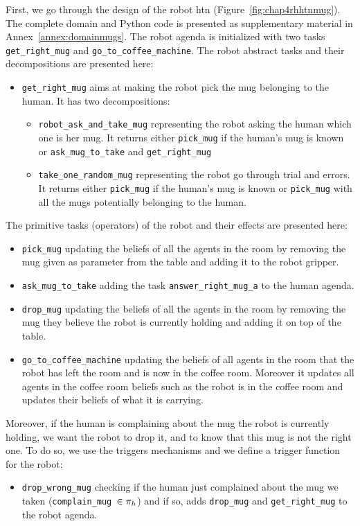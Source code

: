 \documentclass[a4paper,11pt,twoside]{StyleThese}
\begin{document}
First, we go through the design of the robot \acrshort{htn} (Figure~\ref{fig:chap4rhhtnmug}). The complete domain and Python code is presented as supplementary material in Annex~\ref{annex:domainmugs}. The robot agenda is initialized with two tasks \verb'get_right_mug' and \verb'go_to_coffee_machine'. The robot abstract tasks and their decompositions are presented here:
\begin{itemize}
\item \verb'get_right_mug' aims at making the robot pick the mug belonging to the human. It has two decompositions:
	\begin{itemize}
	\item \verb'robot_ask_and_take_mug' representing the robot asking the human which one is her mug. It returns either \verb'pick_mug' if the human's mug is known or \verb'ask_mug_to_take' and \verb'get_right_mug'
	\item \verb'take_one_random_mug' representing the robot go through trial and errors. It returns either \verb'pick_mug' if the human's mug is known or \verb'pick_mug' with all the mugs potentially belonging to the human.
	\end{itemize}
\end{itemize}
The primitive tasks (operators) of the robot and their effects are presented here:
\begin{itemize}
\item \verb'pick_mug' updating the beliefs of all the agents in the room by removing the mug given as parameter from the table and adding it to the robot gripper.
\item \verb'ask_mug_to_take' adding the task \verb'answer_right_mug_a' to the human agenda.
\item \verb'drop_mug' updating the beliefs of all the agents in the room by removing the mug they believe the robot is currently holding and adding it on top of the table.
\item \verb'go_to_coffee_machine' updating the beliefs of all agents in the room that the robot has left the room and is now in the coffee room. Moreover it updates all agents in the coffee room beliefs such as the robot is in the coffee room and updates their beliefs of what it is carrying.
\end{itemize}
Moreover, if the human is complaining about the mug the robot is currently holding, we want the robot to drop it, and to know that this mug is not the right one. To do so, we use the triggers mechanisms and we define a trigger function for the robot:
\begin{itemize}
\item \verb'drop_wrong_mug' checking if the human just complained about the mug we taken (\verb'complain_mug'~$\in \pi_h$) and if so, adds \verb'drop_mug' and \verb'get_right_mug' to the robot agenda.
\end{itemize}
\end{document}
